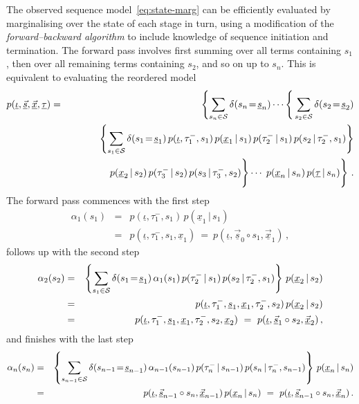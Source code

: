 \documentclass[a4paper]{article}
\begin{document}
The observed sequence model~\eqref{eq:state-marg} can be efficiently evaluated by marginalising over the state of each stage
in turn, using a modification of the {\em forward--backward algorithm} to include knowledge of
sequence initiation and termination.
 The forward pass involves first summing over all terms containing $s_1$, then over all remaining terms containing $s_2$,
and so on up to $s_n$. This is equivalent to evaluating the reordered model
\begin{eqnarray}
   p(\underline{\iota},\underline{\vec{s}},\underline{\vec{x}},\underline{\tau}) 
& = & 
   \left\{\sum_{s_n\in{\cal S}}\delta(s_n\!=\!\underline{s}_n)
\cdots
\right\{\sum_{s_2\in{\cal S}}\delta(s_2\!=\!\underline{s}_2)
\nonumber\\&&
\hspace*{10mm}{}
\left\{\sum_{s_1\in{\cal S}}\delta(s_1\!=\!\underline{s}_1)\,
p(\underline{\iota},\tau^-_1,s_1)\,p(\underline{x}_1\,|\,s_1)\,p(\tau^-_2\,|\,s_1)\,p(s_2\,|\,\tau^-_2,s_1)\right\}
\nonumber\\&&
\left.\rule{0pt}{6mm}
p(\underline{x}_{2}\,|\,s_2)\,p(\tau^-_3\,|\,s_2)\,p(s_3\,|\,\tau^-_3,s_2)\right\}
\cdots
\left.\rule{0pt}{6mm}\,p(\underline{x}_{n}\,|\,s_n)
\,p(\underline{\tau}\,|\,s_n)\right\}
\,.
\label{eq:forward}
\end{eqnarray}
 The forward pass commences with the first step
\begin{eqnarray}
  \alpha_1(s_1) & = & p(\underline{\iota},\tau^-_1,s_1)\,p(\underline{x}_1\,|\,s_1)
\nonumber\\&=&
p(\underline{\iota},\tau^-_1,s_1,\underline{x}_1)~=~p(\underline{\iota},\underline{\vec{s}}_0\circ s_1,\underline{\vec{x}}_1)\,,
\label{eq:alpha_1}
\end{eqnarray}
follows up with the second step
\begin{eqnarray}
  \alpha_2(s_2) & = & 
\left\{\sum_{s_1\in{\cal S}}\delta(s_1\!=\!\underline{s}_1)\,
\alpha_1(s_1)\,p(\tau^-_2\,|\,s_1)\,p(s_2\,|\,\tau^-_2,s_1)\right\}
\,p(\underline{x}_2\,|\,s_2)
\nonumber\\&=&
p(\underline{\iota},\tau^-_1,\underline{s}_1,\underline{x}_1,\tau^-_2,s_2)\,p(\underline{x}_2\,|\,s_2)
\nonumber\\&=&
p(\underline{\iota},\tau^-_1,\underline{s}_1,\underline{x}_1,\tau^-_2,s_2,\underline{x}_2)
~=~p(\underline{\iota},\underline{\vec{s}}_1\circ s_2,\underline{\vec{x}}_2)
\,,
\label{eq:alpha_2}
\end{eqnarray}
and finishes with the last step
\begin{eqnarray}
  \alpha_n(s_n) & = & 
\left\{\sum_{s_{n-1}\in{\cal S}}\delta(s_{n-1}\!=\!\underline{s}_{n-1})\,
\alpha_{n-1}(s_{n-1})\,p(\tau^-_n\,|\,s_{n-1})\,p(s_n\,|\,\tau^-_n,s_{n-1})\right\}
\,p(\underline{x}_n\,|\,s_n)
\nonumber\\&=&
p(\underline{\iota},\underline{\vec{s}}_{n-1}\circ s_n,\underline{\vec{x}}_{n-1})\,p(\underline{x}_n\,|\,s_n)
~=~p(\underline{\iota},\underline{\vec{s}}_{n-1}\circ s_n,\underline{\vec{x}}_n)
\,.
\label{eq:alpha_n}
\end{eqnarray}
\end{document}
